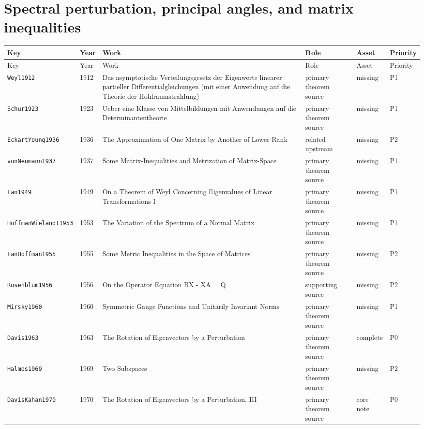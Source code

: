 \documentclass[10pt]{article}
\newcommand{\code}[1]{\texttt{#1}}
\begin{document}
\section*{Spectral perturbation, principal angles, and matrix inequalities}
\begin{longtable}{@{}p{}p{}p{}p{}p{}p{}@{}}
\toprule
Key & Year & Work & Role & Asset & Priority \\
\midrule
\endfirsthead
\toprule
Key & Year & Work & Role & Asset & Priority \\
\midrule
\endhead
\code{Weyl1912} & 1912 & Das asymptotische Verteilungsgesetz der Eigenwerte linearer partieller Differentialgleichungen (mit einer Anwendung auf die Theorie der Hohlraumstrahlung) & primary theorem source & missing & P1 \\
\code{Schur1923} & 1923 & Ueber eine Klasse von Mittelbildungen mit Anwendungen auf die Determinantentheorie & primary theorem source & missing & P1 \\
\code{EckartYoung1936} & 1936 & The Approximation of One Matrix by Another of Lower Rank & related upstream & missing & P2 \\
\code{vonNeumann1937} & 1937 & Some Matrix-Inequalities and Metrization of Matrix-Space & primary theorem source & missing & P1 \\
\code{Fan1949} & 1949 & On a Theorem of Weyl Concerning Eigenvalues of Linear Transformations I & primary theorem source & missing & P1 \\
\code{HoffmanWielandt1953} & 1953 & The Variation of the Spectrum of a Normal Matrix & primary theorem source & missing & P1 \\
\code{FanHoffman1955} & 1955 & Some Metric Inequalities in the Space of Matrices & primary theorem source & missing & P2 \\
\code{Rosenblum1956} & 1956 & On the Operator Equation BX - XA = Q & supporting source & missing & P2 \\
\code{Mirsky1960} & 1960 & Symmetric Gauge Functions and Unitarily Invariant Norms & primary theorem source & missing & P1 \\
\code{Davis1963} & 1963 & The Rotation of Eigenvectors by a Perturbation & primary theorem source & complete & P0 \\
\code{Halmos1969} & 1969 & Two Subspaces & primary theorem source & missing & P2 \\
\code{DavisKahan1970} & 1970 & The Rotation of Eigenvectors by a Perturbation. III & primary theorem source & core note & P0 \\

\end{longtable}
\end{document}
